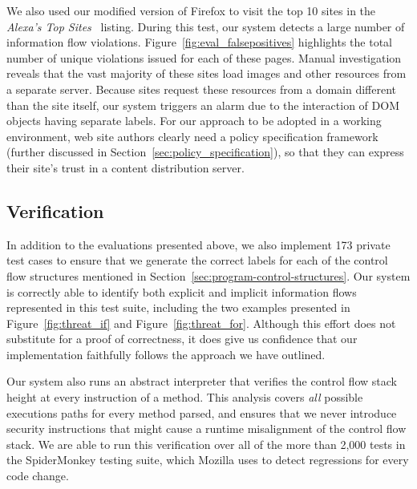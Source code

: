 We also used our modified version of Firefox to visit the top 10 sites in the \textit{Alexa's Top Sites}~\cite{alexa} listing.
During this test, our system detects a large number of information flow violations.
Figure~\ref{fig:eval_falsepositives} highlights the total number of unique violations issued for each of these pages.
Manual investigation reveals that the vast majority of these sites load images and other resources from a separate server.
Because sites request these resources from a domain different than the site itself, our system triggers an alarm due to the interaction of DOM objects having separate labels.
For our approach to be adopted in a working environment, web site authors clearly need a policy specification framework (further discussed in Section~\ref{sec:policy_specification}), so that they can express their site's trust in a content distribution server.

\begin{comment}
\begin{figure}[htp]
  \centerline{\texttt{[image: graphics/evaluation\_falsepositives.pdf]}}
  \caption{Information flow alarms triggered when browsing Alexa's Top Sites in the United States~\cite{alexa}.}
  \label{fig:eval_falsepositives}
\end{figure}
\end{comment}

\subsection{Verification}

In addition to the evaluations presented above, we also implement 173 private test cases to ensure that we generate the correct labels for each of the control flow structures mentioned in Section~\ref{sec:program-control-structures}.
Our system is correctly able to identify both explicit and implicit information flows represented in this test suite, including the two examples presented in Figure~\ref{fig:threat_if} and Figure~\ref{fig:threat_for}.
Although this effort does not substitute for a proof of correctness, it does give us confidence that our implementation faithfully follows the approach we have outlined.

Our system also runs an abstract interpreter that verifies the control flow stack height at every instruction of a method.
This analysis covers \emph{all} possible executions paths for every method parsed, and ensures that we never introduce security instructions that might cause a runtime misalignment of the control flow stack.
We are able to run this verification over all of the more than 2,000 tests in the SpiderMonkey testing suite, which Mozilla uses to detect regressions for every code change.

